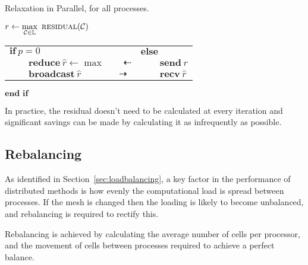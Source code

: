 \documentclass[twoside]{IIBproject}
\newcommand{\dra}{\dashrightarrow}
\newcommand{\dla}{\dashleftarrow}
\numberwithin{figure}{section}
\begin{document}
        \begin{algorithm}[!htbp]
            \caption{Relaxation in Parallel, for all processes.}
            \label{alg:parrelax}

            \begin{algorithmic}
                \Repeat
                    \State {}
                        \State {}
                    \EndFor
                    \State $r \gets \max\limits_{\mathcal{C}\in\mathbb{L}}\ \textproc{residual}(\mathcal{C})$
                    \Statex
                    \State \begin{tabularx}{0.8\textwidth}{XX}
                        $\textbf{if}\ p=0$ & $\textbf{else}$ \\
                        $\qquad\textbf{reduce}\ \hat r \gets \max\qquad\dla$ & $\qquad\textbf{send}\ r$ \\
                        $\qquad\textbf{broadcast}\ \hat r\qquad\qquad\dra$ & $\qquad\textbf{recv}\ \hat r$
                    \end{tabularx}
                    \State $\textbf{end if}$
                \Statex
            \end{algorithmic}
        \end{algorithm}

        In practice, the residual doesn't need to be calculated at every iteration and significant savings can be made by calculating it as infrequently as possible. 



    \subsection{Rebalancing} %
        \label{sec:rebalancing}

        As identified in Section~\ref{sec:loadbalancing}, a key factor in the performance of distributed methods is how evenly the computational load is spread between processes. If the mesh is changed then the loading is likely to become unbalanced, and rebalancing is required to rectify this. 

        Rebalancing is achieved by calculating the average number of cells per processor, and the movement of cells between processes required to achieve a perfect balance.
\end{document}
